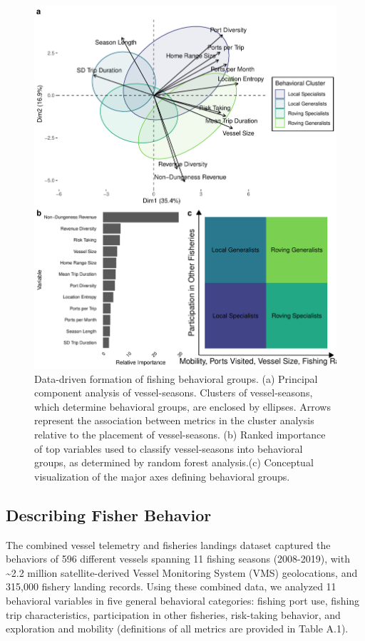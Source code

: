 \documentclass[]{elsarticle} %
\begin{document}
\begin{figure}%
\includegraphics[width=\linewidth]{fig_pca_rf.pdf}
\caption{Data-driven formation of fishing behavioral groups. (a) Principal component analysis of vessel-seasons. Clusters of vessel-seasons, which determine behavioral groups, are enclosed by ellipses. Arrows represent the association between metrics in the cluster analysis relative to the placement of vessel-seasons. (b) Ranked importance of top variables used to classify vessel-seasons into behavioral groups, as determined by random forest analysis.(c) Conceptual visualization of the major axes defining behavioral groups.}
\label{fig:pca}
\end{figure}

\hypertarget{describing-fisher-behavior}{%
\subsection{Describing Fisher
Behavior}\label{describing-fisher-behavior}}

The combined vessel telemetry and fisheries landings dataset captured
the behaviors of 596 different vessels spanning 11 fishing seasons
(2008-2019), with \textasciitilde2.2 million satellite-derived Vessel
Monitoring System (VMS) geolocations, and 315,000 fishery landing
records. Using these combined data, we analyzed 11 behavioral variables
in five general behavioral categories: fishing port use, fishing trip
characteristics, participation in other fisheries, risk-taking behavior,
and exploration and mobility (definitions of all metrics are provided in
Table A.1).
\end{document}
